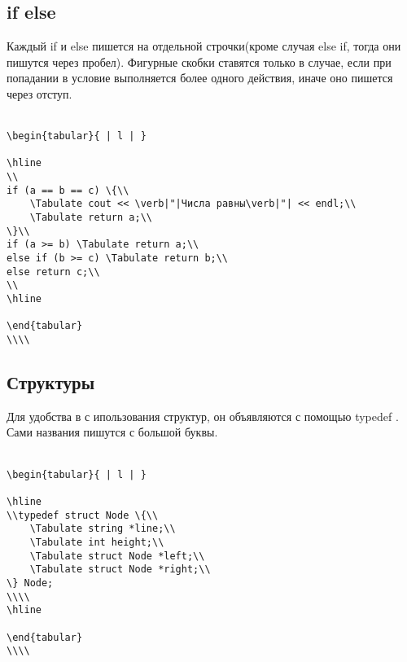 \documentclass{article}
\begin{document}
\subsection{if else}
Каждый if и else пишется на отдельной строчки(кроме случая else if, тогда они пишутся через пробел). Фигурные скобки ставятся только в случае, если при попадании в условие выполняется более одного действия, иначе оно пишется через отступ.\\\\
\begin{lstlisting}
\begin{tabular}{ | l | }

\hline
\\
if (a == b == c) \{\\
    \Tabulate cout << \verb|"|Числа равны\verb|"| << endl;\\
    \Tabulate return a;\\ 
\}\\
if (a >= b) \Tabulate return a;\\
else if (b >= c) \Tabulate return b;\\
else return c;\\
\\
\hline

\end{tabular}
\\\\
\end{lstlisting}
\subsection{Структуры}
Для удобства в с ипользования структур, он объявляются с помощью typedef \cite{three}. Сами названия пишутся с большой буквы.\\\\
\begin{lstlisting}
\begin{tabular}{ | l | }

\hline
\\typedef struct Node \{\\
    \Tabulate string *line;\\
    \Tabulate int height;\\
    \Tabulate struct Node *left;\\
    \Tabulate struct Node *right;\\
\} Node;
\\\\
\hline

\end{tabular}
\\\\
\end{lstlisting}
\end{document}
